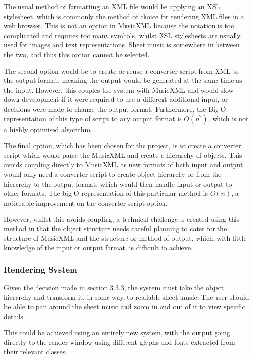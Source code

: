 The usual method of formatting an XML file would be applying an XSL stylesheet, which is commonly the method of choice for rendering XML files in a web browser. This is not an option in MusicXML because the notation is too complicated and requires too many symbols, whilst XSL stylesheets are usually used for images and text representations. Sheet music is somewhere in between the two, and thus this option cannot be selected.

The second option would be to create or reuse a converter script from XML to the output format, meaning the output would be generated at the same time as the input. However, this couples the system with MusicXML and would slow down development if it were required to use a different additional input, or decisions were made to change the output format. Furthermore, the Big O representation of this type of script to any output format is $O(n^2)$, which is not a highly optimised algorithm.

The final option, which has been chosen for the project, is to create a converter script which would parse the MusicXML and create a hierarchy of objects. This avoids coupling directly to MusicXML as new formats of both input and output would only need a converter script to create object hierarchy or from the hierarchy to the output format, which would then handle input or output to other formats. The big O representation of this particular method is $O(n)$, a noticeable improvement on the converter script option.

However, whilst this avoids coupling, a technical challenge is created using this method in that the object structure needs careful planning to cater for the structure of MusicXML and the structure or method of output, which, with little knowledge of the input or output format, is difficult to achieve.

\subsubsection{Rendering System}
Given the decision made in section 3.3.3, the system must take the object hierarchy and transform it, in some way, to readable sheet music. The user should be able to pan around the sheet music and zoom in and out of it to view specific details.

This could be achieved using an entirely new system, with the output going directly to the render window using different glyphs and fonts extracted from their relevant classes.

